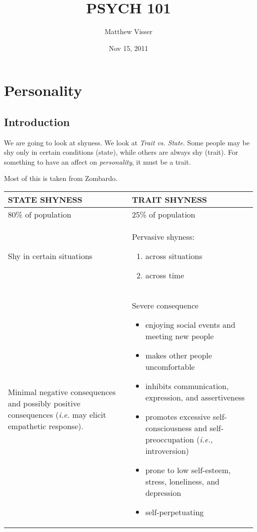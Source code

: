 \documentclass[12pt]{article}
\begin{document}
\title{PSYCH 101}
\author{Matthew Visser}
\date{Nov 15, 2011}
\maketitle

\section{Personality}

\subsection{Introduction}

We are going to look at shyness. We look at \emph{Trait vs. State}. Some people
may be shy only in certain conditions (state), while others are always shy
(trait). For something to have an affect on \emph{personality}, it must be a
trait.

Most of this is taken from Zombardo.

\begin{tabular}{|p{}|p{}|}
	\hline
	STATE SHYNESS & TRAIT SHYNESS\\
	\hline
	80\% of population & 25\% of population \\
	\hline
	Shy in certain situations & Pervasive shyness: \begin{enumerate}
		\item across situations
		\item across time
	\end{enumerate} \\
	\hline
	Minimal negative consequences and possibly positive consequences
	(\textit{i.e.} may elicit empathetic response). & Severe consequence
	\begin{itemize}
		\item enjoying social events and meeting new people
		\item makes other people uncomfortable
		\item inhibits communication, expression, and assertiveness
		\item promotes excessive self-consciousness and self-preoccupation
			(\textit{i.e.}, introversion)
		\item prone to low self-esteem, stress, loneliness, and depression
		\item self-perpetuating
	\end{itemize}\\
	\hline
\end{tabular}
\end{document}
